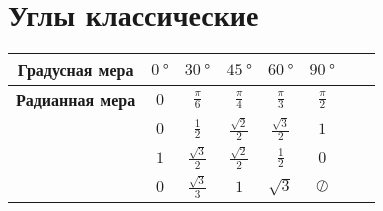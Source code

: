\section*{Углы классические}
\begin{table}[!ht]
\setlength{\tabcolsep}{1em} %
\centering
  \tabulinesep=1.5mm
  \begin{tabu}{|c|c|c|c|c|c|c|c|}
    \hline
    \textbf{Градусная мера}
      & $\SI{0}{\degree}$
      & $\SI{30}{\degree}$
      & $\SI{45}{\degree}$
      & $\SI{60}{\degree}$
      & $\SI{90}{\degree}$\\
    \hline
    \textbf{Радианная мера}
      & $\displaystyle 0$
      & $\displaystyle \frac{\pi}{6}$
      & $\displaystyle \frac{\pi}{4}$
      & $\displaystyle \frac{\pi}{3}$
      & $\displaystyle \frac{\pi}{2}$\\
    \hline
    \textbf{\bm{$\sin \theta$}}
      & $\displaystyle 0$
      & $\displaystyle \frac{1}{2}$
      & $\displaystyle \frac{\sqrt 2}{2}$
      & $\displaystyle \frac{\sqrt 3}{2}$
      & $\displaystyle 1$\\
    \hline
    \textbf{\bm{$\cos \theta$}}
      & $\displaystyle 1$
      & $\displaystyle \frac{\sqrt 3}{2}$
      & $\displaystyle \frac{\sqrt 2}{2}$
      & $\displaystyle \frac{1}{2}$
      & $\displaystyle 0$\\
    \hline
    \textbf{\bm{$\tg \theta$}}
      & $\displaystyle 0$
      & $\displaystyle \frac{\sqrt 3}{3}$
      & $\displaystyle 1$
      & $\displaystyle \sqrt 3$
      & $\oslash$ \\
    \hline
  \end{tabu}
\end{table}
